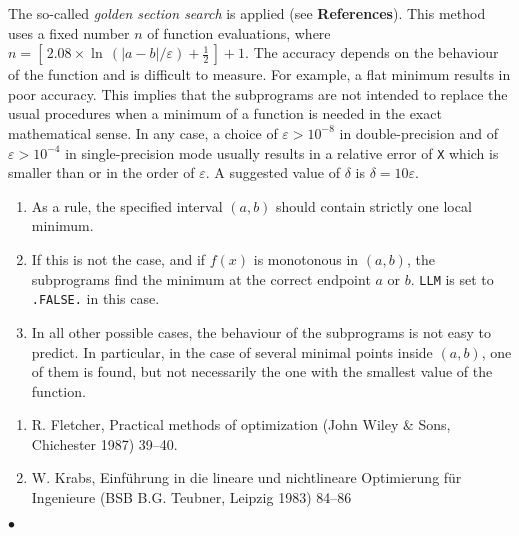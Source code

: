 \Method
The so-called {\it golden section search} is applied (see
{\bf References}). This method uses a fixed number $n$
of function evaluations, where
$n=[\,2.08 \times \ln\,(|a-b|/\varepsilon)+\frac{1}{2}\,]+1$.
\Accuracy
The accuracy depends on the behaviour of the function and is difficult
to measure. For example, a flat minimum results in poor accuracy.
This implies that the subprograms are not intended to replace
the usual procedures when a minimum of a function
is needed in the exact mathematical sense.
In any case, a choice of $\varepsilon > 10^{-8}$ in double-precision
and of $\varepsilon > 10^{-4}$ in single-precision mode usually
results in a relative error of {\tt X} which is smaller than
or in the order of $\varepsilon$. A suggested value of $\delta$ is
$\delta=10\varepsilon$.
\newpage
\Notes
\begin{enumerate}
\item As a rule, the specified interval $(a,b)$ should contain strictly
one
local minimum.
\item If this is not the case, and if $f(x)$ is monotonous in $(a,b)$,
the subprograms find the minimum at the correct endpoint $a$ or $b$.
{\tt LLM} is set to {\tt .FALSE.} in this case.
\item In all other possible cases, the behaviour of the subprograms is
not easy to predict. In particular, in the case of several minimal
points inside $(a,b)$, one of them is found, but not necessarily
the one with the smallest value of the function.
\end{enumerate}
\Refer
\begin{enumerate}
\item R. Fletcher, Practical methods of optimization (John Wiley \& Sons,
Chichester 1987) 39--40.
\item W. Krabs, Einf\"uhrung in die lineare und nichtlineare
Optimierung f\"ur Ingenieure (BSB B.G. Teubner, Leipzig 1983) 84--86
\end{enumerate}
$\bullet$
